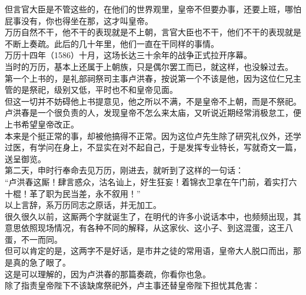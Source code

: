 \begin{multicols}{\theparacolNo}
但言官大臣是不管这些的，在他们的世界观里，皇帝不但要办事，还要上班，哪怕屁事没有，你也得坐在那，这才叫皇帝。\\

万历自然不干，他不干的表现就是不上朝，言官大臣也不干，他们不干的表现就是不断上奏疏。此后的几十年里，他们一直在干同样的事情。\\

万历十四年（1586）十月，这场长达三十余年的战争正式拉开序幕。\\

当时的万历，基本上还属于上朝族，只是偶尔罢工而已，就这样，也没躲过去。\\

第一个上书的，是礼部祠祭司主事卢洪春，按说第一个不该是他，因为这位仁兄主管的是祭祀，级别又低，平时也不和皇帝见面。\\

但这一切并不妨碍他上书提意见，他之所以不满，不是皇帝不上朝，而是不祭祀。\\

卢洪春是一个很负责的人，发现皇帝不怎么来太庙，又听说近期经常消极怠工，便上书希望皇帝改正。\\

本来是个挺正常的事，却被他搞得不正常。因为这位卢先生除了研究礼仪外，还学过医，有学问在身上，不显实在对不起自己，于是发挥专业特长，写就奇文一篇，送呈御览。\\

第二天，申时行奉命去见万历，刚进去，就听到了这样的一句话：\\

“卢洪春这厮！肆言惑众，沽名讪上，好生狂妄！着锦衣卫拿在午门前，着实打六十棍！革了职为民当差，永不叙用！”\\

以上言辞，系万历同志之原话，并无加工。\\

很久很久以前，这厮两个字就诞生了，在明代的许多小说话本中，也频频出现，其意思依照现场情况，有各种不同的解释，从这家伙、这小子、到这混蛋，这王八蛋，不一而同。\\

但可以肯定的是，这两字不是好话，是市井之徒的常用语，皇帝大人脱口而出，那是真的急了眼了。\\

这是可以理解的，因为卢洪春的那篇奏疏，你看你也急。\\

除了指责皇帝陛下不该缺席祭祀外，卢主事还替皇帝陛下担忧其危害：\\


\end{multicols}
